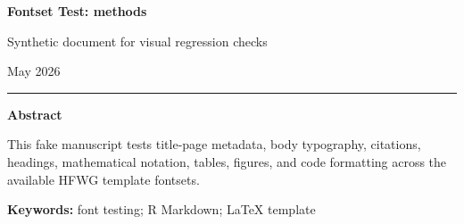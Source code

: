 \documentclass[12pt]{article}
\newif\ifhfwganon
\begin{document}
\begin{titlepage}
\thispagestyle{empty}
\vspace*{0.12\textheight}
\begin{center}
\begin{singlespace}

{\LARGE\bfseries Fontset Test: methods\par}

\vspace{0.35em}
{\large Synthetic document for visual regression checks\par}

\vspace{2.2em}

\hfwgauthorblock

\par\vspace{1.5\baselineskip}
\hfwgseriesblock

\ifhfwganon\else
\vspace{0.35em}
{\small May 2026}\par
\fi

\vspace{2.2\baselineskip}
\noindent\rule{0.35\textwidth}{0.4pt}\par
\vspace{0.65em}
\begin{minipage}{0.78\textwidth}
\small\singlespacing
\textbf{Abstract}\par\vspace{0.3em}
This fake manuscript tests title-page metadata, body typography,
citations, headings, mathematical notation, tables, figures, and code
formatting across the available HFWG template fontsets.
\par\vspace{0.6em}
\textbf{Keywords:} font testing; R Markdown; LaTeX template
\end{minipage}

\end{singlespace}
\end{center}
\vfill
\end{titlepage}
\else
\end{document}
